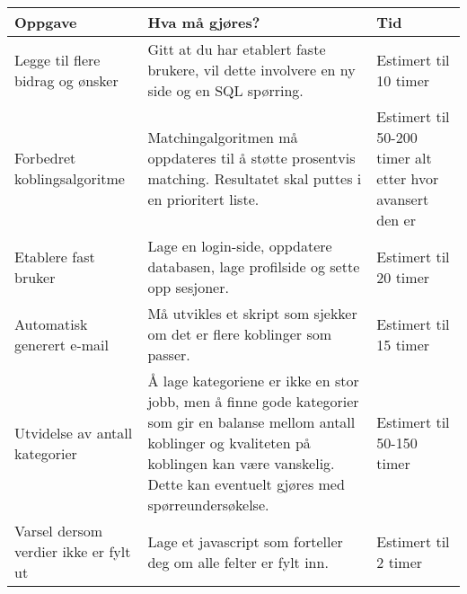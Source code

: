 \begin{table}[H]
    \begin{tabular}{|p{} | p{} |p{} |}
    \hline
    {\bf Oppgave}                               & {\bf Hva må gjøres?}                                                                                                                                                                                                    & {\bf Tid}                                                                        \\ \hline
    Legge til flere bidrag og ønsker      & Gitt at du har etablert faste brukere, vil dette involvere en ny side og en SQL spørring.                                                                                                                         & Estimert til 10 timer                                                      \\ \hline
    Forbedret koblingsalgoritme           & Matchingalgoritmen må oppdateres til å støtte prosentvis matching. Resultatet skal puttes i en prioritert liste.                                                                                                  & Estimert til 50-200 timer alt etter hvor avansert den er                   \\ \hline
    Etablere fast bruker                  & Lage en login-side, oppdatere databasen, lage profilside og sette opp sesjoner.                                                                                                                                   & Estimert til 20 timer                                                      \\ \hline
    Automatisk generert e-mail            & Må utvikles et skript som sjekker om det er flere koblinger som passer.                                                                                                                                           & Estimert til 15 timer                                                      \\ \hline
    Utvidelse av antall kategorier        & Å lage kategoriene er ikke en stor jobb, men å finne gode kategorier som gir en balanse mellom antall koblinger og kvaliteten på koblingen kan være vanskelig. Dette kan eventuelt gjøres med spørreundersøkelse. & Estimert til 50-150 timer                                                  \\ \hline
    Varsel dersom verdier ikke er fylt ut & Lage et javascript som forteller deg om alle felter er fylt inn.                                                                                                                                                  & Estimert til 2 timer                                                       \\ \hline

\end{tabular}
\end{table}

